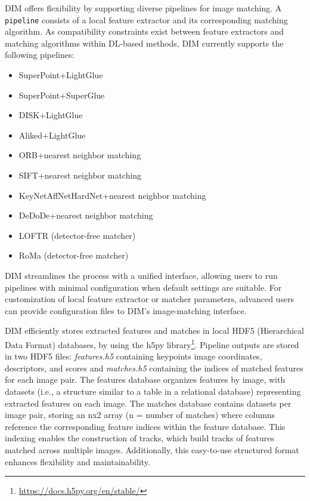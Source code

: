DIM offers flexibility by supporting diverse pipelines for image matching. 
A \texttt{pipeline} consists of a local feature extractor and its corresponding matching algorithm. 
As compatibility constraints exist between feature extractors and matching algorithms within DL-based methods, DIM currently supports the following pipelines:
\begin{itemize}
    \item SuperPoint+LightGlue
    \item SuperPoint+SuperGlue
    \item DISK+LightGlue
    \item Aliked+LightGlue
    \item ORB+nearest neighbor matching
    \item SIFT+nearest neighbor matching
    \item KeyNetAffNetHardNet+nearest neighbor matching
    \item DeDoDe+nearest neighbor matching
    \item LOFTR (detector-free matcher)
    \item RoMa (detector-free matcher)
\end{itemize}

DIM streamlines the process with a unified interface, allowing users to run pipelines with minimal configuration when default settings are suitable. 
For customization of local feature extractor or matcher parameters, advanced users can provide configuration files to DIM's image-matching interface.

DIM efficiently stores extracted features and matches in local HDF5 (Hierarchical Data Format) databases, by using the h5py library\footnote{\url{https://docs.h5py.org/en/stable/}}. 
Pipeline outputs are stored in two HDF5 files: \textit{features.h5} containing keypoints image coordinates, descriptors, and scores and \textit{matches.h5} containing the indices of matched features for each image pair. 
The features database organizes features by image, with datasets (i.e., a structure similar to a table in a relational database) representing extracted features on each image. 
The matches database contains datasets per image pair, storing an nx2 array (n = number of matches) where columns reference the corresponding feature indices within the feature database. 
This indexing enables the construction of tracks, which build tracks of features matched across multiple images. 
Additionally, this easy-to-use structured format enhances flexibility and maintainability.

